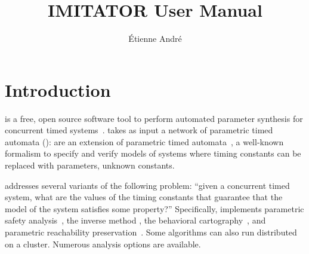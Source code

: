 



\title{IMITATOR User Manual}
\author{Étienne André}

\newcommand{\titleOnFirstPage}{IMITATOR User Manual}





\sloppy







\chapter{Introduction}

\imitator{} is a free, open source software tool to perform automated parameter synthesis for concurrent timed systems~\cite{AFKS12}.
\imitator{} takes as input a network of \imitator{} parametric timed automata (\NIPTA{}): \NIPTA{} are an extension of parametric timed automata~\cite{AHV93}, a well-known formalism to specify and verify models of systems where timing constants can be replaced with parameters, \ie{} unknown constants.

\imitator{} addresses several variants of the following problem:
``given a concurrent timed system, what are the values of the timing constants that guarantee that the model of the system satisfies some property?''
Specifically, \imitator{} implements parametric safety analysis~\cite{AHV93,JLR15}, the inverse method \cite{ACEF09,AM15}, the behavioral cartography~\cite{AF10}, and parametric reachability preservation~\cite{ALNS15}.
Some algorithms can also run distributed on a cluster.
Numerous analysis options are available.

